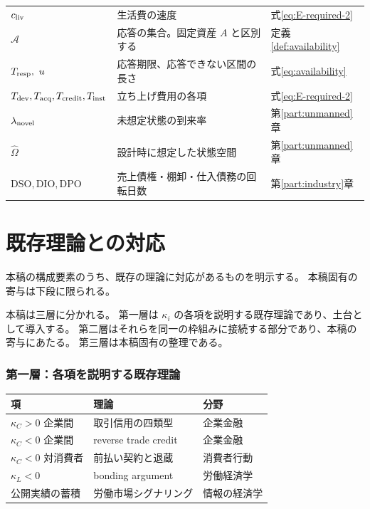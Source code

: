 \begin{longtable}{@{}>{\raggedright\arraybackslash}p{}>{\raggedright\arraybackslash}p{}>{\raggedright\arraybackslash}p{}@{}}
$c_{\rm liv}$ & 生活費の速度 & 式\eqref{eq:E-required-2} \\
$\mathcal{A}$ & 応答の集合。固定資産 $A$ と区別する & 定義\ref{def:availability} \\
$T_{\rm resp},\ u$ & 応答期限、応答できない区間の長さ & 式\eqref{eq:availability} \\
$T_{\rm dev},T_{\rm acq},T_{\rm credit},T_{\rm inst}$ & 立ち上げ費用の各項 & 式\eqref{eq:E-required-2} \\
$\lambda_{\rm novel}$ & 未想定状態の到来率 & 第\ref{part:unmanned}章 \\
$\hat\Omega$ & 設計時に想定した状態空間 & 第\ref{part:unmanned}章 \\
$\mathrm{DSO},\mathrm{DIO},\mathrm{DPO}$ & 売上債権・棚卸・仕入債務の回転日数 & 第\ref{part:industry}章 \\
\end{longtable}

\chapter{既存理論との対応}
\label{app:priorwork}

本稿の構成要素のうち、既存の理論に対応があるものを明示する。
本稿固有の寄与は下段に限られる。

本稿は三層に分かれる。
第一層は $\kappa_i$ の各項を説明する既存理論であり、土台として導入する。
第二層はそれらを同一の枠組みに接続する部分であり、本稿の寄与にあたる。
第三層は本稿固有の整理である。

\subsection*{第一層：各項を説明する既存理論}

\begin{center}
\begin{tabularx}{\textwidth}{@{}lXl@{}}
\toprule
項 & 理論 & 分野 \\
\midrule
$\kappa_C>0$ 企業間 & 取引信用の四類型 \cite{petersen1997,schwartz1974} & 企業金融 \\
$\kappa_C<0$ 企業間 & reverse trade credit \cite{mateut2014,daripa2011} & 企業金融 \\
$\kappa_C<0$ 対消費者 & 前払い契約と退蔵 \cite{dellavigna2006,einav2025,nber2026pnbl} & 消費者行動 \\
$\kappa_L<0$ & bonding argument \cite{akerlof1986} & 労働経済学 \\
公開実績の蓄積 & 労働市場シグナリング \cite{spence1973} & 情報の経済学 \\
\bottomrule
\end{tabularx}
\label{tab:priorwork-layer1}
\end{center}

